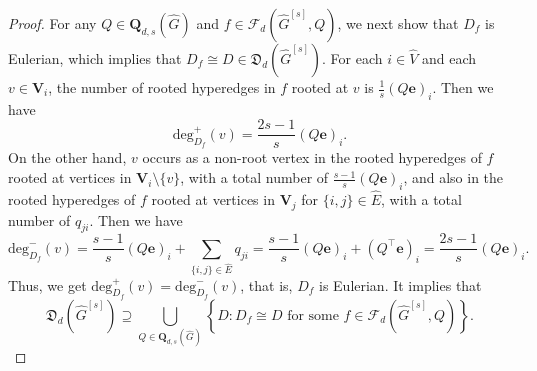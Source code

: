\documentclass[10pt,a4paper]{amsart}
\begin{document}
\begin{proof}
For any $Q \in \mathbf{Q}_{d,s}(\widehat{G})$ and $f \in \mathcal{F}_{d}(\widehat{G}^{[s]},Q)$,
we next show that $D_{f}$ is Eulerian,
which implies that $D_{f} \cong D \in \mathfrak{D}_{d}(\widehat{G}^{[s]})$.
For each $i \in \widehat{V}$ and each $v \in \mathbf{V}_{i}$,
the number of rooted hyperedges in $f$ rooted at $v$ is $\frac{1}{s}(Q\mathbf{e})_{i}$.
Then we have $$\mathrm{deg}_{D_{f}}^{+}(v)=\frac{2s-1}{s}(Q\mathbf{e})_{i}.$$
On the other hand,
$v$ occurs as a non-root vertex in the rooted hyperedges of $f$ rooted at vertices in $\mathbf{V}_{i} \setminus \{v\}$,
with a total number of $\frac{s-1}{s}(Q\mathbf{e})_{i}$,
and also in the rooted hyperedges of $f$ rooted at vertices in $\mathbf{V}_{j}$ for $\{i,j\} \in \widehat{E}$,
with a total number of $q_{ji}$.
Then we have $$\mathrm{deg}_{D_{f}}^{-}(v)=\frac{s-1}{s}(Q\mathbf{e})_{i}+\sum_{\{i,j\} \in \widehat{E}}q_{ji}
=\frac{s-1}{s}(Q\mathbf{e})_{i}+\left(Q^{\top}\mathbf{e}\right)_{i}
=\frac{2s-1}{s}(Q\mathbf{e})_{i}.$$
Thus,
we get $\mathrm{deg}_{D_{f}}^{+}(v)=\mathrm{deg}_{D_{f}}^{-}(v)$,
that is, $D_{f}$ is Eulerian.
It implies that $$\mathfrak{D}_{d}(\widehat{G}^{[s]})\supseteq
\bigcup_{Q \in \mathbf{Q}_{d,s}(\widehat{G})}\left\{ D : \mbox{$D_{f} \cong D$ for some $f \in \mathcal{F}_{d}(\widehat{G}^{[s]},Q)$} \right\}.$$
\end{proof}
\end{document}
